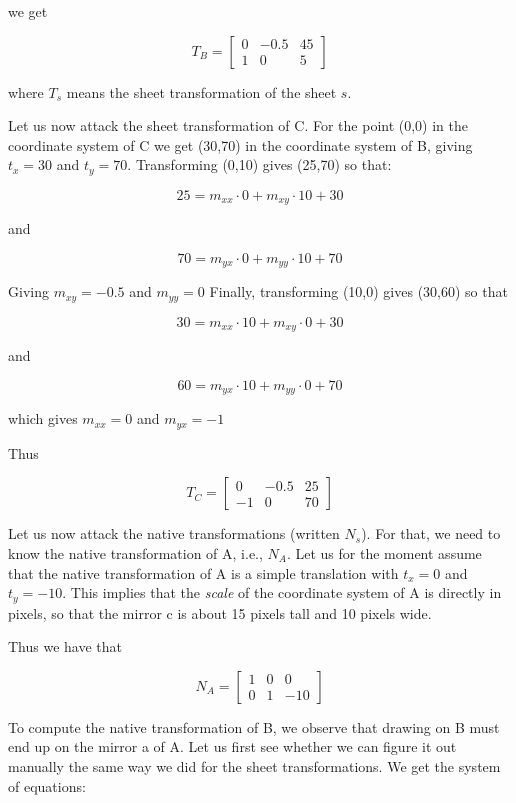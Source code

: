 \documentclass{article}
\begin{document}
we get 

\[ T_B = \left[ \begin{array}{ccc}
0 & -0.5 & 45\\
1 & 0 & 5 
\end{array} \right] \]

where $T_s$ means the sheet transformation of the sheet $s$. 

Let us now attack the sheet transformation of C.  For the point (0,0)
in the coordinate system of C we get (30,70) in the coordinate system
of B, giving $t_x = 30$ and $t_y = 70$.  Transforming (0,10) gives
(25,70) so that:

$$25 = m_{xx} \cdot 0 + m_{xy} \cdot 10 + 30$$

and 

$$70 = m_{yx} \cdot 0 + m_{yy} \cdot 10 + 70$$

Giving $m_{xy} = -0.5$ and $m_{yy} = 0$
Finally, transforming (10,0) gives (30,60) so that

$$30 = m_{xx} \cdot 10 + m_{xy} \cdot 0 + 30$$

and

$$60 = m_{yx} \cdot 10 + m_{yy} \cdot 0 + 70$$

which gives $m_{xx} = 0$ and $m_{yx} = -1$

Thus

\[ T_C = \left[ \begin{array}{ccc}
0 & -0.5 & 25\\
-1 & 0 & 70 
\end{array} \right] \]

Let us now attack the native transformations (written $N_s$).  For
that, we need to know the native transformation of A, i.e., $N_A$.
Let us for the moment assume that the native transformation of A is a
simple translation with $t_x = 0$ and $t_y = -10$.  This implies that
the \emph{scale} of the coordinate system of A is directly in pixels,
so that the mirror c is about 15 pixels tall and 10 pixels wide.

Thus we have that 

\[ N_A = \left[ \begin{array}{ccc}
1 & 0 & 0\\
0 & 1 & -10 
\end{array} \right] \]

To compute the native transformation of B, we observe that drawing on
B must end up on the mirror a of A.  Let us first see whether we can
figure it out manually the same way we did for the sheet
transformations.  We get the system of equations:
\end{document}
